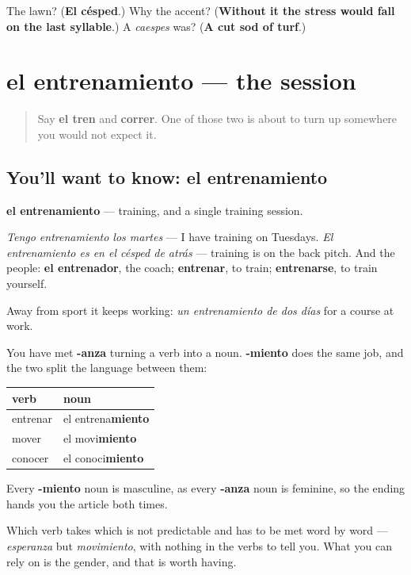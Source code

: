 \begin{tcolorbox}[breakable,colback=teal!4,colframe=teal!35!black,title={Before you move on}]
The lawn? (\textbf{El césped}.) Why the accent? (\textbf{Without it the stress would fall on the last syllable}.) A \emph{caespes} was? (\textbf{A cut sod of turf}.)
\end{tcolorbox}
\section[el entrenamiento]{el entrenamiento — the session}

\label{lesson:ES-C450-entrenamiento}



\begin{quote}
Say \textbf{el tren} and \textbf{correr}. One of those two is about to turn up somewhere you would not expect it.
\end{quote}

\subsection*{You'll want to know: el entrenamiento}
\textbf{el entrenamiento} — training, and a single training session.

\emph{Tengo entrenamiento los martes} — I have training on Tuesdays. \emph{El entrenamiento es en el césped de atrás} — training is on the back pitch. And the people: \textbf{el entrenador}, the coach; \textbf{entrenar}, to train; \textbf{entrenarse}, to train yourself.

Away from sport it keeps working: \emph{un entrenamiento de dos días} for a course at work.

\begin{grammarlens}[title={Grammar Lens: -miento names the process}]
You have met \textbf{-anza} turning a verb into a noun. \textbf{-miento} does the same job, and the two split the language between them:

\noindent
\begin{tabularx}{\linewidth}{@{}>{\raggedright\arraybackslash}X>{\raggedright\arraybackslash}X@{}}
\toprule
\textbf{verb} & \textbf{noun} \\
\midrule
entrenar & el entrena\textbf{miento} \\
mover & el movi\textbf{miento} \\
conocer & el conoci\textbf{miento} \\
\bottomrule
\end{tabularx}

Every \textbf{-miento} noun is masculine, as every \textbf{-anza} noun is feminine, so the ending hands you the article both times.

Which verb takes which is not predictable and has to be met word by word — \emph{esperanza} but \emph{movimiento}, with nothing in the verbs to tell you. What you can rely on is the gender, and that is worth having.
\end{grammarlens}


